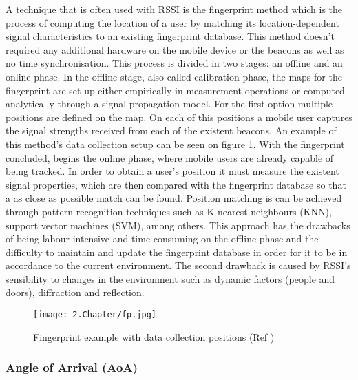 A technique that is often used with \ac{RSSI} is the fingerprint method which is the process of computing the location of a user by matching its location-dependent signal characteristics to an existing fingerprint database. This method doesn't required any additional hardware on the mobile device or the beacons as well as no time synchronisation. This process is divided in two stages: an offline and an online phase. In the offline stage, also called calibration phase, the maps for the fingerprint are set up either empirically in measurement operations or computed analytically through a signal propagation model. For the first option multiple positions are defined on the map. On each of this positions a mobile user captures the signal strengths received from each of the existent beacons. An example of this method's data collection setup can be seen on figure \ref{fig:fp}. With the fingerprint concluded, begins the online phase, where mobile users are already capable of being tracked. In order to obtain a user's position it must measure the existent signal properties, which are then compared with the fingerprint database so that a as close as possible match can be found. Position matching is can be achieved through pattern recognition techniques such as K-nearest-neighbours (KNN), support vector machines (SVM), among others.
This approach has the drawbacks of being labour intensive and time consuming on the offline phase and the difficulty to maintain and update the fingerprint database in order for it to be in accordance to the current environment. The second drawback is caused by \ac{RSSI}'s sensibility to changes in the environment such as dynamic factors (people and doors), diffraction and reflection. 


\begin{figure}[H]
	\centering
		\texttt{[image: 2.Chapter/fp.jpg]}
	\caption[Fingerprint example with data collection positions (Ref \cite{fingerprint}) ]{ Fingerprint example with data collection positions (Ref \cite{fingerprint}) }
	\label{fig:fp}
\end{figure}

\subsubsection{Angle of Arrival (AoA) }
\label{subsubsec:aoa}

